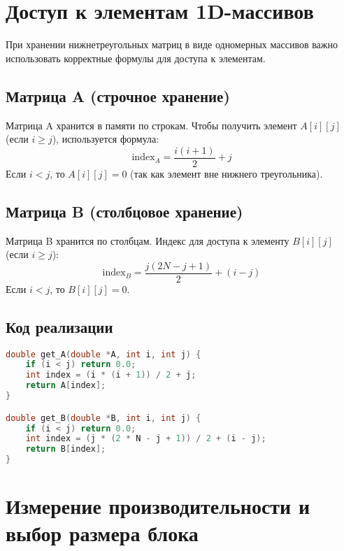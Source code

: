 \documentclass[14pt, russian]{matmex-diploma-custom}
\begin{document}
\section{Доступ к элементам 1D-массивов}

При хранении нижнетреугольных матриц в виде одномерных массивов важно использовать корректные формулы для доступа к элементам.

\subsection{Матрица A (строчное хранение)}

Матрица A хранится в памяти по строкам. Чтобы получить элемент $A[i][j]$ (если $i \geq j$), используется формула:
\begin{equation}
\text{index}_A = \frac{i(i+1)}{2} + j
\end{equation}
Если $i < j$, то $A[i][j] = 0$ (так как элемент вне нижнего треугольника).

\subsection{Матрица B (столбцовое хранение)}

Матрица B хранится по столбцам. Индекс для доступа к элементу $B[i][j]$ (если $i \geq j$):
\begin{equation}
\text{index}_B = \frac{j(2N - j + 1)}{2} + (i - j)
\end{equation}
Если $i < j$, то $B[i][j] = 0$.

\subsection{Код реализации}

{\footnotesize
\begin{lstlisting}[language=C, basicstyle=\ttfamily\footnotesize]
double get_A(double *A, int i, int j) {
    if (i < j) return 0.0;
    int index = (i * (i + 1)) / 2 + j;
    return A[index];
}

double get_B(double *B, int i, int j) {
    if (i < j) return 0.0;
    int index = (j * (2 * N - j + 1)) / 2 + (i - j);
    return B[index];
}
\end{lstlisting}
}

\section{Измерение производительности и выбор размера блока}
\end{document}
